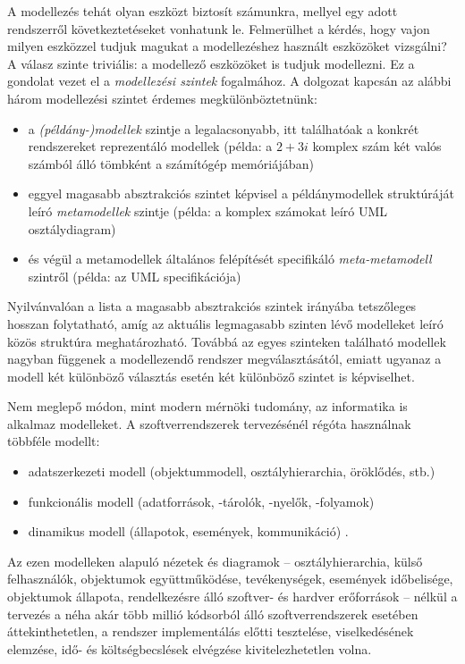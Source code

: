 A modellezés tehát olyan eszközt biztosít számunkra, mellyel egy adott rendszerről következtetéseket vonhatunk le.
Felmerülhet a kérdés, hogy vajon milyen eszközzel tudjuk magukat a modellezéshez használt eszközöket vizsgálni?
A válasz szinte triviális: a modellező eszközöket is tudjuk modellezni.
Ez a gondolat vezet el a \emph{modellezési szintek} fogalmához.
A dolgozat kapcsán az alábbi három modellezési szintet érdemes megkülönböztetnünk:
\begin{itemize}
    \item a \emph{(példány-)modellek} szintje a legalacsonyabb, itt találhatóak a konkrét rendszereket reprezentáló modellek (példa: a $2 + 3i$ komplex szám két valós számból álló tömbként a számítógép memóriájában)
    \item eggyel magasabb absztrakciós szintet képvisel a példánymodellek struktúráját leíró \emph{metamodellek} szintje (példa: a komplex számokat leíró \gls{UML} osztálydiagram)
    \item és végül a metamodellek általános felépítését specifikáló \emph{meta-metamodell} szintről (példa: az \gls{UML} specifikációja)
\end{itemize}
Nyilvánvalóan a lista a magasabb absztrakciós szintek irányába tetszőleges hosszan folytatható, amíg az aktuális legmagasabb szinten lévő modelleket leíró közös struktúra meghatározható.
Továbbá az egyes szinteken található modellek nagyban függenek a modellezendő rendszer megválasztásától, emiatt ugyanaz a modell két különböző választás esetén két különböző szintet is képviselhet.

Nem meglepő módon, mint modern mérnöki tudomány, az informatika is alkalmaz modelleket.
A szoftverrendszerek tervezésénél régóta használnak többféle modellt:
\begin{itemize}
	\item adatszerkezeti modell (objektummodell, osztályhierarchia, öröklődés, stb.)
	\item funkcionális modell (adatforrások, -tárolók, -nyelők, -folyamok)
	\item dinamikus modell (állapotok, események, kommunikáció) \cite{Kondorosi07}.
\end{itemize}
Az ezen modelleken alapuló nézetek és diagramok -- osztályhierarchia, külső felhasználók, objektumok együttműködése, tevékenységek, események időbelisége, objektumok állapota, rendelkezésre álló szoftver- és hardver erőforrások -- nélkül a tervezés a néha akár több millió kódsorból álló szoftverrendszerek esetében áttekinthetetlen, a rendszer implementálás előtti tesztelése, viselkedésének elemzése, idő- és költségbecslések elvégzése kivitelezhetetlen volna.

